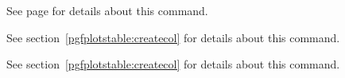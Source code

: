 \begin{command}{\pgfplotstablevertcat{}}
	See page \pageref{table:vertcat} for details about this command.
\end{command}

\begin{command}{\pgfplotstablenew{}}
	See section~\ref{pgfplotstable:createcol} for details about this command.
\end{command}
\begin{command}{\pgfplotstablecreatecol{}}
	See section~\ref{pgfplotstable:createcol} for details about this command.
\end{command}
	
